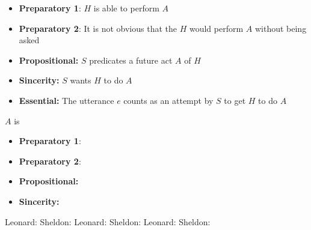 \documentclass[headrule,footrule]{foils}
\begin{document}

\begin{small}
  \begin{itemize}
\item \textbf{Preparatory 1}: $H$ is able to perform  $A$
\item \textbf{Preparatory 2}: It is not obvious that the $H$ would perform $A$  without being asked
\item \textbf{Propositional:} $S$ predicates a future act $A$ of $H$
\item \textbf{Sincerity:}  $S$ wants $H$ to do $A$ 
\item \textbf{Essential:} The utterance $e$ counts as an attempt by $S$ to get $H$ to do $A$
\end{itemize}
\end{small}
$A$ is 

\begin{itemize}
\item \textbf{Preparatory 1}: 
\item \textbf{Preparatory 2}: 
\item \textbf{Propositional:} 
\item \textbf{Sincerity:}  
\end{itemize}
 


\begin{exe}
  \ex Leonard: 
  \ex Sheldon: 
  \ex Leonard: 
  \ex Sheldon: 
  \ex Leonard: 
  \ex Sheldon: 
\end{exe}
\end{document}
